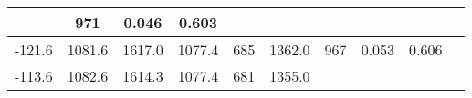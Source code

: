 \documentclass[a4paper,10pt]{article}
\begin{document}
\begin{longtable}{
     |
%    
    c|
%    
    c|
%    
    c|
%    
    c|
%    
    c|
%    
    c|
%    
    c|
%    
    c|
%    
    c|
%    
    c|
%    
    }
%        
        & 971
%        

%        

%        
        & 0.046
%        

%        

%        
        & 0.603
%        

%        
        \\
        \hline

        

%        

%        
        -121.6
%        

%        

%        
        & 1081.6
%        

%        

%        
        & 1617.0
%        

%        

%        
        & 1077.4
%        

%        

%        
        & 685
%        

%        

%        
        & 1362.0
%        

%        

%        
        & 967
%        

%        

%        
        & 0.053
%        

%        

%        
        & 0.606
%        

%        
        \\
        \hline

        

%        

%        
        -113.6
%        

%        

%        
        & 1082.6
%        

%        

%        
        & 1614.3
%        

%        

%        
        & 1077.4
%        

%        

%        
        & 681
%        

%        

%        
        & 1355.0
%        

%        


\end{longtable}
\end{document}
